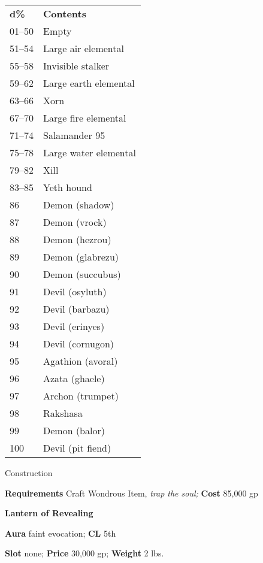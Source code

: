 \begin{tabular}{ll}
\textbf{d\%} & \textbf{Contents}     \\
01--50        & Empty                 \\
51--54        & Large air elemental   \\
55--58        & Invisible stalker     \\
59--62        & Large earth elemental \\
63--66        & Xorn                  \\
67--70        & Large fire elemental  \\
71--74        & Salamander 95         \\
75--78        & Large water elemental \\
79--82        & Xill                  \\
83--85        & Yeth hound            \\
86           & Demon (shadow)        \\
87           & Demon (vrock)         \\
88           & Demon (hezrou)        \\
89           & Demon (glabrezu)      \\
90           & Demon (succubus)      \\
91           & Devil (osyluth)       \\
92           & Devil (barbazu)       \\
93           & Devil (erinyes)       \\
94           & Devil (cornugon)      \\
95           & Agathion (avoral)     \\
96           & Azata (ghaele)        \\
97           & Archon (trumpet)      \\
98           & Rakshasa              \\
99           & Demon (balor)         \\
100          & Devil (pit fiend)    
\end{tabular} 

Construction
				
\textbf{Requirements} Craft Wondrous Item,\textit{ trap the soul;}\textbf{ Cost }85,000 gp
				
\textbf{Lantern of Revealing}
				
\textbf{Aura} faint evocation;\textbf{ CL }5th
				
\textbf{Slot} none; \textbf{Price} 30,000 gp; \textbf{Weight} 2 lbs.
				
